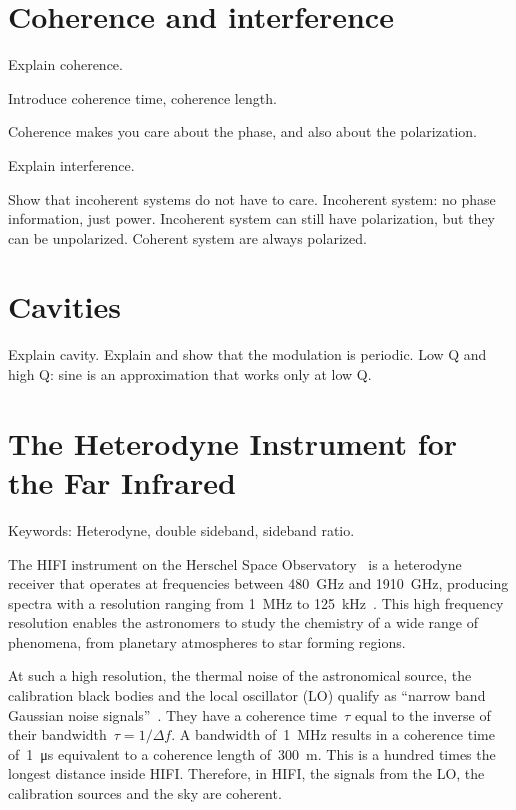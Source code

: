 \section{Coherence and interference}
Explain coherence.

Introduce coherence time, coherence length.

Coherence makes you care about the phase, and also about the polarization.

Explain interference.

Show that incoherent systems do not have to care.
Incoherent system: no phase information, just power.
Incoherent system can still have polarization, but they can be unpolarized.
Coherent system are always polarized.



\section{Cavities}
Explain cavity.
Explain and show that the modulation is periodic.
Low Q and high Q: sine is an approximation that works only at low Q.


\section{The Heterodyne Instrument for the Far Infrared}

Keywords: Heterodyne, double sideband, sideband ratio.

The HIFI instrument on the Herschel Space Observatory~\cite{AA_518_L1} is a heterodyne receiver that operates at frequencies between \SI{480}{\giga\hertz} and \SI{1910}{\giga\hertz},
producing spectra with a resolution ranging from \SI{1}{\mega\hertz} to \SI{125}{\kilo\hertz}~\cite{AA_518_L6}.
This high frequency resolution enables the astronomers to study the chemistry of a wide range of phenomena, from planetary atmospheres to star forming regions.

At such a high resolution, the thermal noise of the astronomical source, the calibration black bodies and the local oscillator (LO) qualify as ``narrow band Gaussian noise signals''~\cite{siegman1986lasers}.
They have a coherence time~$\tau$ equal to the inverse of their bandwidth~$\tau=1/\Delta f$.
A bandwidth of~\SI{1}{\mega\hertz} results in a coherence time of~\SI{1}{\micro\second} equivalent to a coherence length of~\SI{300}{\meter}.
This is a hundred times the longest distance inside HIFI.
Therefore, in HIFI, the signals from the LO, the calibration sources and the sky are coherent.

